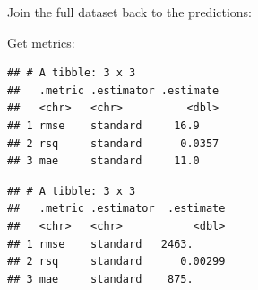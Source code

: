 \documentclass[
]{book}
\newenvironment{Shaded}{\begin{snugshade}}{\end{snugshade}}
\newcommand{\DataTypeTok}[1]{\textcolor[rgb]{0.13,0.29,0.53}{#1}}
\newcommand{\KeywordTok}[1]{\textcolor[rgb]{0.13,0.29,0.53}{\textbf{#1}}}
\newcommand{\NormalTok}[1]{#1}
\newcommand{\OperatorTok}[1]{\textcolor[rgb]{0.81,0.36,0.00}{\textbf{#1}}}
\newcommand{\StringTok}[1]{\textcolor[rgb]{0.31,0.60,0.02}{#1}}
\begin{document}
\begin{Shaded}
\end{Shaded}

Join the full dataset back to the predictions:

\begin{Shaded}
\end{Shaded}

Get metrics:

\begin{Shaded}
\end{Shaded}

\begin{verbatim}
## # A tibble: 3 x 3
##   .metric .estimator .estimate
##   <chr>   <chr>          <dbl>
## 1 rmse    standard     16.9   
## 2 rsq     standard      0.0357
## 3 mae     standard     11.0
\end{verbatim}

\begin{Shaded}
\end{Shaded}

\begin{verbatim}
## # A tibble: 3 x 3
##   .metric .estimator  .estimate
##   <chr>   <chr>           <dbl>
## 1 rmse    standard   2463.     
## 2 rsq     standard      0.00299
## 3 mae     standard    875.
\end{verbatim}
\end{document}
